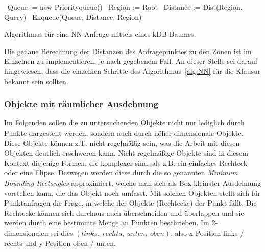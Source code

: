 \begin{algorithm}[htb]
	\SetAlgoLined
	\DontPrintSemicolon
	\BlankLine
	\BlankLine
	\ {Queue := new Priorityqueue()}\;
	\ {Region := Root}\;
	\ {Distance := Dist(Region, Query)}\;
	\ {Enqueue(Queue, Distance, Region)}\;
	\BlankLine
	\BlankLine
	\caption{Algorithmus für eine NN-Anfrage mittels eines kDB-Baumes.\label{alg:NN}}
\end{algorithm}


Die genaue Berechnung der Distanzen des Anfragepunktes zu den Zonen ist im Einzelnen
zu implementieren, je nach gegebenem Fall. An dieser Stelle sei darauf hingewiesen,
dass die einzelnen Schritte des Algorithmus~\ref{alg:NN} für die Klausur bekannt sein
sollten.

\subsubsection{Objekte mit räumlicher Ausdehnung}
Im Folgenden sollen die zu untersuchenden Objekte nicht nur lediglich durch Punkte
dargestellt werden, sondern auch durch höher-dimensionale Objekte. Diese Objekte
können z.T. nicht regelmäßig sein, was die Arbeit mit diesen Objekten deutlich
erschweren kann. 
Nicht regelmäßige Objekte sind in diesem Kontext diejenige Formen, die komplexer sind,
als z.B. ein einfaches Rechteck oder eine Elipse.
Deswegen werden diese durch die so genannten \textit{Minimum
Bounding Rectangles} approximiert, welche man sich als Box kleinster
Ausdehnung vorstellen kann, die das Objekt noch umfasst. Mit solchen Objekten
stellt sich für Punktanfragen die Frage, in welche der Objekte (Rechtecke) der
Punkt fällt. Die Rechtecke können sich durchaus auch überschneiden und überlappen
und sie werden durch eine bestimmte Menge an Punkten beschrieben. Im 2-dimensionalen
sei dies \((links,\ rechts,\ unten,\ oben)\), also x-Position links / rechts und 
y-Position oben / unten. 


